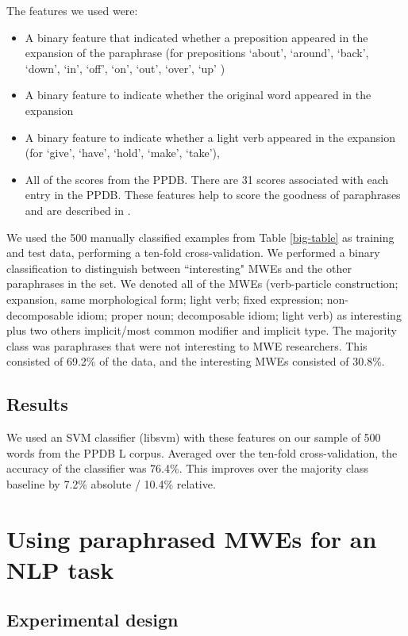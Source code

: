 \documentclass[11pt]{article}
\begin{document}
The features we used were:
\begin{itemize}
\item A binary feature that indicated whether a preposition appeared in the expansion of the paraphrase (for prepositions  `about', `around', `back', `down', `in', `off', `on', `out', `over', `up' )
\item A binary feature to indicate whether the original word appeared in the expansion
\item A binary feature to indicate whether a light verb appeared in the expansion (for  `give', `have', `hold', `make', `take'), 
\item All of the scores from the PPDB.  There are 31 scores associated with each entry in the PPDB.  These features help to score the goodness of paraphrases and are described in .
\end{itemize}

We used the 500 manually classified examples from Table \ref{big-table} as training and test data, performing a ten-fold cross-validation.  We performed a binary classification to distinguish between ``interesting" MWEs and the other paraphrases in the set.  We denoted all of the  MWEs (verb-particle construction; expansion, same morphological form; light verb; fixed expression; non-decomposable idiom; proper noun; decomposable idiom; light verb) as interesting plus two others implicit/most common modifier and implicit type.  The majority class was paraphrases that were not interesting to MWE researchers.  This consisted of 69.2\% of the data, and the interesting MWEs consisted of 30.8\%.

\subsection{Results}

We used an SVM classifier (libsvm) with these features on our sample of 500 words from the PPDB L corpus. Averaged over the ten-fold cross-validation, the accuracy of the classifier was 76.4\%. This improves over the majority class baseline by 7.2\% absolute / 10.4\% relative.

\section{Using paraphrased MWEs for an NLP task}

\subsection{Experimental design}
\end{document}
